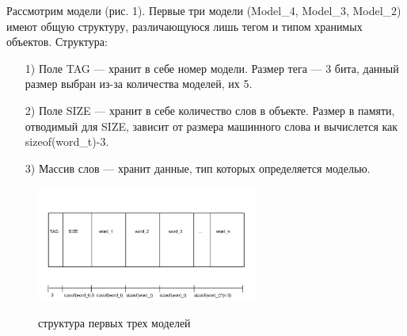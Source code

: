 Рассмотрим модели (рис. 1). Первые три модели (Model\_4, Model\_3, Model\_2) имеют общую структуру, различающуюся лишь тегом и типом хранимых объектов.
Структура:
\begin{enumerate}
\item[1)] Поле TAG — хранит в себе номер модели. Размер тега — 3 бита, данный размер выбран из-за количества моделей, их 5.
\item[2)] Поле SIZE — хранит в себе количество слов в объекте. Размер в памяти, отводимый для SIZE, зависит от размера машинного слова и вычислется как sizeof(word\_t)-3.
\item[3)] Массив слов — хранит данные, тип которых определяется моделью.
\end{enumerate}

\begin{figure}[h]
\includegraphics[width=0.65\textwidth]{Kren/1}\\
\caption{структура первых трех моделей}
\end{figure}

